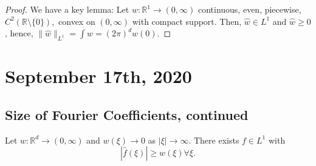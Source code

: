 \documentclass[11pt]{scrartcl}
\newcommand{\R}{\mathbb{R}}
\let \hat \widehat
\newcommand{\<}{\langle}
\renewcommand{\>}{\rangle}
\begin{document}
\begin{proof}
We have a key lemma: Let $w : \R^1 \rightarrow (0, \infty)$ continuous, even, piecewise, $C^2(\R\setminus\{0\}),$ convex on $(0, \infty)$ with compact support.  Then, $\hat{w} \in L^1$ and $\hat{w} \ge 0$, hence, $\|\hat{w}\|_{L^1} = \int \hat{w} = (2\pi)^d w(0).$
\end{proof}
\pagebreak
\section{September 17th, 2020}
\subsection{Size of Fourier Coefficients, continued}
\begin{thm} Let $w:\R^d \rightarrow (0, \infty)$ and $w(\xi) \rightarrow 0$ as $|\xi|\rightarrow \infty$.  There exists $f \in L^1$ with 
$$|\hat{f}(\xi)| \ge w(\xi) \forall \xi.$$
\end{thm}
\end{document}
